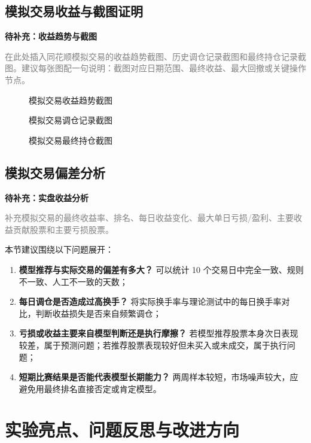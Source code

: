 \documentclass[12pt,a4paper,cn,bibtex]{elegantpaper}
\newcommand{\placeholder}[2]{
    \par\medskip
    \noindent\textbf{待补充：#1}\par
    \noindent\textcolor{gray}{#2}
    \par\medskip
}
\begin{document}
\subsection{模拟交易收益与截图证明}
\placeholder{收益趋势与截图}{在此处插入同花顺模拟交易的收益趋势截图、历史调仓记录截图和最终持仓记录截图。建议每张图配一句说明：截图对应日期范围、最终收益、最大回撤或关键操作节点。}

\begin{figure}[H]
    \centering
    \caption{模拟交易收益趋势截图}
    \label{fig:live-return}
\end{figure}

\begin{figure}[H]
    \centering
    \caption{模拟交易调仓记录截图}
    \label{fig:live-trade-log}
\end{figure}

\begin{figure}[H]
    \centering
    \caption{模拟交易最终持仓截图}
    \label{fig:live-position}
\end{figure}

\subsection{模拟交易偏差分析}
\placeholder{实盘收益分析}{补充模拟交易的最终收益率、排名、每日收益变化、最大单日亏损/盈利、主要收益贡献股票和主要亏损股票。}

本节建议围绕以下问题展开：
\begin{enumerate}[label=\arabic*)]
    \item \textbf{模型推荐与实际交易的偏差有多大？} 可以统计 10 个交易日中完全一致、规则不一致、人工不一致的天数；
    \item \textbf{每日调仓是否造成过高换手？} 将实际换手率与理论测试中的每日换手率对比，判断收益损失是否来自频繁调仓；
    \item \textbf{亏损或收益主要来自模型判断还是执行摩擦？} 若模型推荐股票本身次日表现较差，属于预测问题；若推荐股票表现较好但未买入或未成交，属于执行问题；
    \item \textbf{短期比赛结果是否能代表模型长期能力？} 两周样本较短，市场噪声较大，应避免用最终排名直接否定或肯定模型。
\end{enumerate}

\section{实验亮点、问题反思与改进方向}
\end{document}

